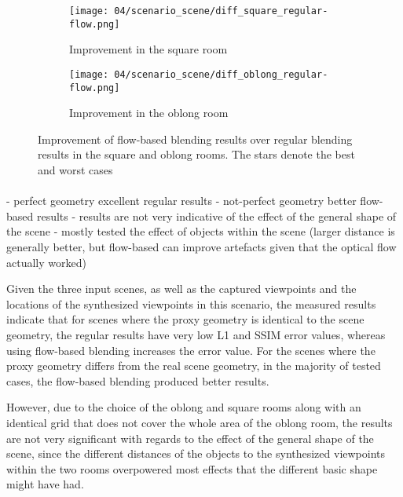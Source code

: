 \begin{figure}
\centering
    \hfill
    \begin{subfigure}[b]{0.45\textwidth}
            \centering
            \texttt{[image: 04/scenario\_scene/diff\_square\_regular-flow.png]}
            \caption{Improvement in the square room}
    \end{subfigure}
    \hfill
    \begin{subfigure}[b]{0.45\textwidth}
            \centering
            \texttt{[image: 04/scenario\_scene/diff\_oblong\_regular-flow.png]}
            \caption{Improvement in the oblong room}
    \end{subfigure}
    \hfill
  \caption[Improvement of flow-based blending results over regular blending results in the square and oblong rooms]{Improvement of flow-based blending results over regular blending results in the square and oblong rooms. The stars denote the best and worst cases} \label{fig:scene_diff_square_oblong}
\end{figure}


\paragraph{}
- perfect geometry \ar excellent regular results
- not-perfect geometry \ar better flow-based results
- results are not very indicative of the effect of the general shape of the scene
- mostly tested the effect of objects within the scene (larger distance is generally better, but flow-based can improve artefacts given that the optical flow actually worked)

Given the three input scenes, as well as the captured viewpoints and the locations of the synthesized viewpoints in this scenario, the measured results indicate that for scenes where the proxy geometry is identical to the scene geometry, the regular results have very low L1 and SSIM error values, whereas using flow-based blending increases the error value. For the scenes where the proxy geometry differs from the real scene geometry, in the majority of tested cases, the flow-based blending produced better results.

However, due to the choice of the oblong and square rooms along with an identical grid that does not cover the whole area of the oblong room, the results are not very significant with regards to the effect of the general shape of the scene, since the different distances of the objects to the synthesized viewpoints within the two rooms overpowered most effects that the different basic shape might have had.

